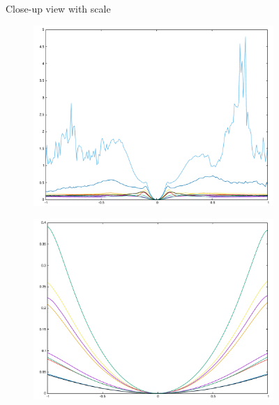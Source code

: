 \begin{figure}[h]
\center
{
\setlength{\fboxsep}{0pt}%
\setlength{\fboxrule}{0.5pt}%
}
\label{fig:t_scale}
\caption{Close-up view with scale}
\end{figure}

\begin{figure}[H]
\begin{subfigure}{.33\textwidth}
	\includegraphics[width=\linewidth]{fig/ajherr/t/L_chi.pdf}
\end{subfigure}%
\begin{subfigure}{.33\textwidth}
	\includegraphics[width=\linewidth]{fig/ajherr/t/M_chi.pdf}

\end{subfigure}
\end{figure}
